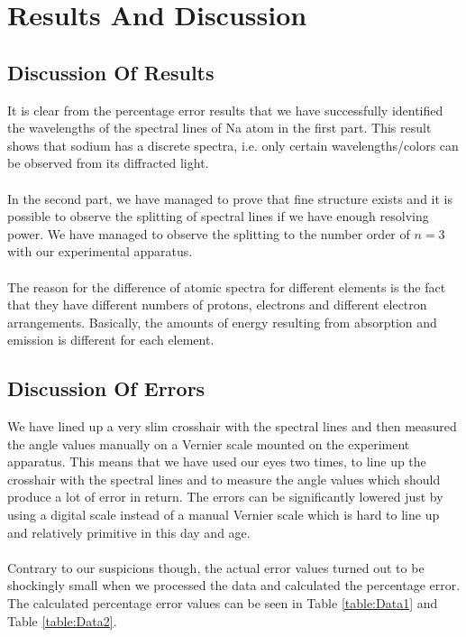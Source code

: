 \section{Results And Discussion}

	\subsection{Discussion Of Results}
		It is clear from the percentage error results that we have successfully identified the wavelengths of the spectral lines of Na atom in the first part. This result shows that sodium has a discrete spectra, i.e. only certain wavelengths/colors can be observed from its diffracted light.
		\\
		\\
		In the second part, we have managed to prove that fine structure exists and it is possible to observe the splitting of spectral lines if we have enough resolving power. We have managed to observe the splitting to the number order of $n = 3$ with our experimental apparatus.
		\\
		\\
		The reason for the difference of atomic spectra for different elements is the fact that they have different numbers of protons, electrons and different electron arrangements. Basically, the amounts of energy resulting from absorption and emission is different for each element.
	
	\subsection{Discussion Of Errors}
	We have lined up a very slim crosshair with the spectral lines and then measured the angle values manually on a Vernier scale mounted on the experiment apparatus. This means that we have used our eyes two times, to line up the crosshair with the spectral lines and to measure the angle values which should produce a lot of error in return. The errors can be significantly lowered just by using a digital scale instead of a manual Vernier scale which is hard to line up and relatively primitive in this day and age.
	\\
	\\
	Contrary to our suspicions though, the actual error values turned out to be shockingly small when we processed the data and calculated the percentage error. The calculated percentage error values can be seen in Table \ref{table:Data1} and Table \ref{table:Data2}.